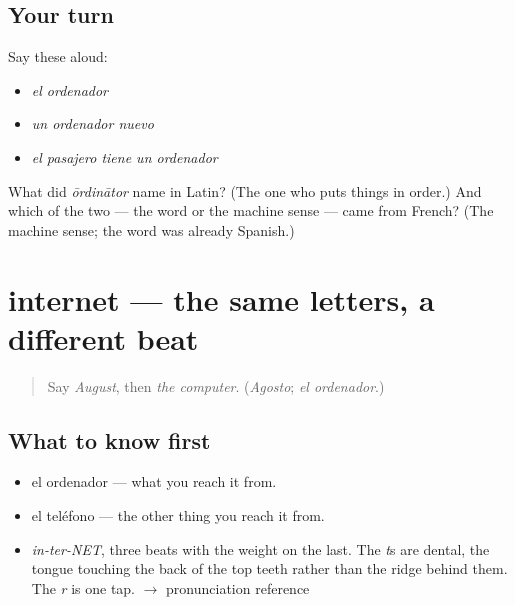\subsection*{Your turn}
Say these aloud:

\begin{itemize}
\raggedright
  \item \emph{el ordenador}
  \item \emph{un ordenador nuevo}
  \item \emph{el pasajero tiene un ordenador}
\end{itemize}

\begin{tcolorbox}[breakable,colback=teal!4,colframe=teal!35!black,title={Before you move on}]
What did \emph{ōrdinātor} name in Latin? (The one who puts things in order.) And which of the two — the word or the machine sense — came from French? (The machine sense; the word was already Spanish.)
\end{tcolorbox}
\section[internet]{internet — the same letters, a different beat}

\label{lesson:ES-C393-internet}



\begin{quote}
Say \emph{August}, then \emph{the computer}. (\emph{Agosto}; \emph{el ordenador}.)
\end{quote}

\subsection*{What to know first}
\begin{itemize}
\raggedright
  \item el ordenador — what you reach it from.
  \item el teléfono — the other thing you reach it from.
\end{itemize}

\begin{sounds}
\begin{itemize}
\raggedright
  \item \emph{in-ter-NET}, three beats with the weight on the last. The \emph{t}s are dental, the tongue touching the back of the top teeth rather than the ridge behind them. The \emph{r} is one tap. $\to$ pronunciation reference
\end{itemize}
\end{sounds}

